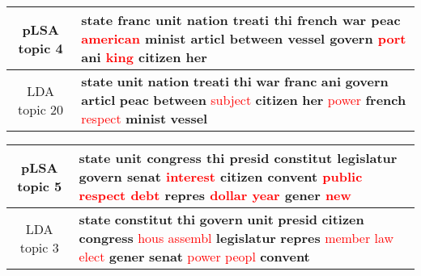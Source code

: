 \begin{center}\begin{tabularx}{\textwidth} {
  | c | >{\raggedright\arraybackslash}X | } \hline 
pLSA topic 4 & \textbf{state} \textbf{franc} \textbf{unit} \textbf{nation} \textbf{treati} \textbf{thi} \textbf{french} \textbf{war} \textbf{peac} \textcolor{red}{american} \textbf{minist} \textbf{articl} \textbf{between} \textbf{vessel} \textbf{govern} \textcolor{red}{port} \textbf{ani} \textcolor{red}{king} \textbf{citizen} \textbf{her} \\ \hline 
LDA topic 20 & \textbf{state} \textbf{unit} \textbf{nation} \textbf{treati} \textbf{thi} \textbf{war} \textbf{franc} \textbf{ani} \textbf{govern} \textbf{articl} \textbf{peac} \textbf{between} \textcolor{red}{subject} \textbf{citizen} \textbf{her} \textcolor{red}{power} \textbf{french} \textcolor{red}{respect} \textbf{minist} \textbf{vessel} \\ \hline 
\end{tabularx}

\end{center}

\begin{center}\begin{tabularx}{\textwidth} {
  | c | >{\raggedright\arraybackslash}X | } \hline 
pLSA topic 5 & \textbf{state} \textbf{unit} \textbf{congress} \textbf{thi} \textbf{presid} \textbf{constitut} \textbf{legislatur} \textbf{govern} \textbf{senat} \textcolor{red}{interest} \textbf{citizen} \textbf{convent} \textcolor{red}{public} \textcolor{red}{respect} \textcolor{red}{debt} \textbf{repres} \textcolor{red}{dollar} \textcolor{red}{year} \textbf{gener} \textcolor{red}{new} \\ \hline 
LDA topic 3 & \textbf{state} \textbf{constitut} \textbf{thi} \textbf{govern} \textbf{unit} \textbf{presid} \textbf{citizen} \textbf{congress} \textcolor{red}{hous} \textcolor{red}{assembl} \textbf{legislatur} \textbf{repres} \textcolor{red}{member} \textcolor{red}{law} \textcolor{red}{elect} \textbf{gener} \textbf{senat} \textcolor{red}{power} \textcolor{red}{peopl} \textbf{convent} \\ \hline 
\end{tabularx}

\end{center}

